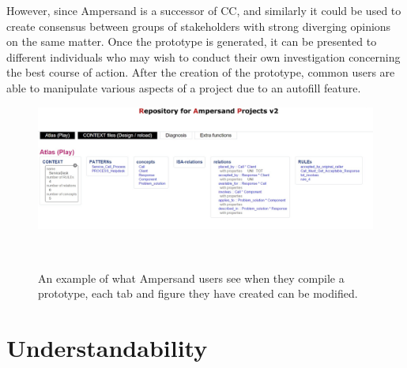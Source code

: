 \documentclass[12pt]{report}
\begin{document}
However, since Ampersand is a successor of CC, \cite[p.10]{RBD}
and similarly it could be used to create consensus between groups of stakeholders with strong 
diverging opinions on the same matter. Once the prototype is generated, it can be presented to 
different individuals who may wish to conduct their own investigation concerning the best course of 
action. After the creation of the prototype, common users are able to manipulate various aspects of 
a project due to an autofill feature. 
\begin{figure}
	\centering
	\includegraphics[width=1.0\textwidth]{../figures/Ampersandmodel}
	\caption{An example of what Ampersand users see when they compile a prototype, each tab and 
	figure they have created can be modified.}~\label{fig:figure3}
\end{figure}

\section{Understandability}
\end{document}
